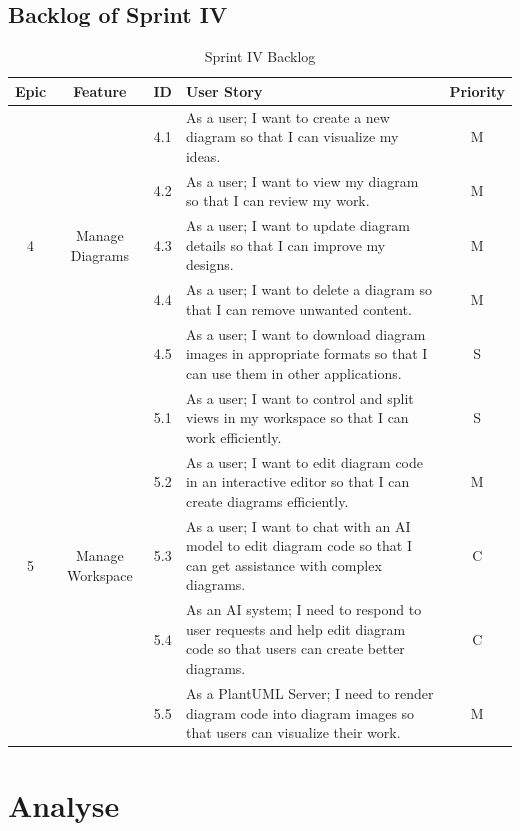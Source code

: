 \subsection{Backlog of Sprint IV}
\begin{table}[H]
    \centering
    \caption{Sprint IV Backlog}
    \begin{tabularx}{\textwidth}{|c|c|c|X|c|}
    \hline
    \textbf{Epic} & \textbf{Feature} & \textbf{ID} & \textbf{User Story} & \textbf{Priority} \\
    \hline
    \multirow{5}{*}{4} & \multirow{5}{*}{Manage Diagrams} & 4.1 & As a user; I want to create a new diagram so that I can visualize my ideas. & M \\
    \cline{3-5}
    & & 4.2 & As a user; I want to view my diagram so that I can review my work. & M \\
    \cline{3-5}
    & & 4.3 & As a user; I want to update diagram details so that I can improve my designs. & M \\
    \cline{3-5}
    & & 4.4 & As a user; I want to delete a diagram so that I can remove unwanted content. & M \\
    \cline{3-5}
    & & 4.5 & As a user; I want to download diagram images in appropriate formats so that I can use them in other applications. & S \\
    \hline
    \multirow{5}{*}{5} & \multirow{5}{*}{Manage Workspace} & 5.1 & As a user; I want to control and split views in my workspace so that I can work efficiently. & S \\
    \cline{3-5}
    & & 5.2 & As a user; I want to edit diagram code in an interactive editor so that I can create diagrams efficiently. & M \\
    \cline{3-5}
    & & 5.3 & As a user; I want to chat with an AI model to edit diagram code so that I can get assistance with complex diagrams. & C \\
    \cline{3-5}
    & & 5.4 & As an AI system; I need to respond to user requests and help edit diagram code so that users can create better diagrams. & C \\
    \cline{3-5}
    & & 5.5 & As a PlantUML Server; I need to render diagram code into diagram images so that users can visualize their work. & M \\
    \hline
    \end{tabularx}
    \end{table}
    
\section{Analyse}

